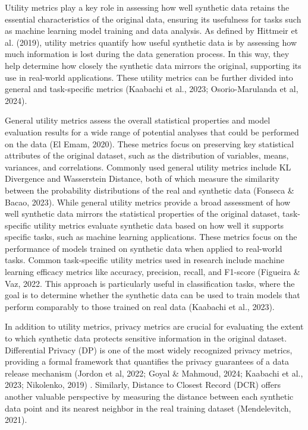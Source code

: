 \documentclass{article}
\begin{document}
Utility metrics play a key role in assessing how well synthetic data retains the essential characteristics of the original data, ensuring its usefulness for tasks such as machine learning model training and data analysis. As defined by Hittmeir et al. (2019), utility metrics quantify how useful synthetic data is by assessing how much information is lost during the data generation process.  In this way, they help determine how closely the synthetic data mirrors the original, supporting its use in real-world applications. These utility metrics can be further divided into general and task-specific metrics (Kaabachi et al., 2023; Osorio-Marulanda et al, 2024).

General utility metrics assess the overall statistical properties and model evaluation results for a wide range of potential analyses that could be performed on the data (El Emam, 2020). These metrics focus on preserving key statistical attributes of the original dataset, such as the distribution of variables, means, variances, and correlations. Commonly used general utility metrics include KL Divergence and Wasserstein Distance, both of which measure the similarity between the probability distributions of the real and synthetic data (Fonseca \& Bacao, 2023). While general utility metrics provide a broad assessment of how well synthetic data mirrors the statistical properties of the original dataset, task-specific utility metrics evaluate synthetic data based on how well it supports specific tasks, such as machine learning applications. These metrics focus on the performance of models trained on synthetic data when applied to real-world tasks. Common task-specific utility metrics used in research include machine learning efficacy metrics like accuracy, precision, recall, and F1-score (Figueira \& Vaz, 2022. This approach is particularly useful in classification tasks, where the goal is to determine whether the synthetic data can be used to train models that perform comparably to those trained on real data (Kaabachi et al., 2023). 

In addition to utility metrics, privacy metrics are crucial for evaluating the extent to which synthetic data protects sensitive information in the original dataset. Differential Privacy (DP) is one of the most widely recognized privacy metrics, providing a formal framework that quantifies the privacy guarantees of a data release mechanism (Jordon et al, 2022; Goyal \& Mahmoud, 2024; Kaabachi et al., 2023; Nikolenko, 2019) . Similarly, Distance to Closest Record (DCR) offers another valuable perspective by measuring the distance between each synthetic data point and its nearest neighbor in the real training dataset (Mendelevitch, 2021).
\end{document}
